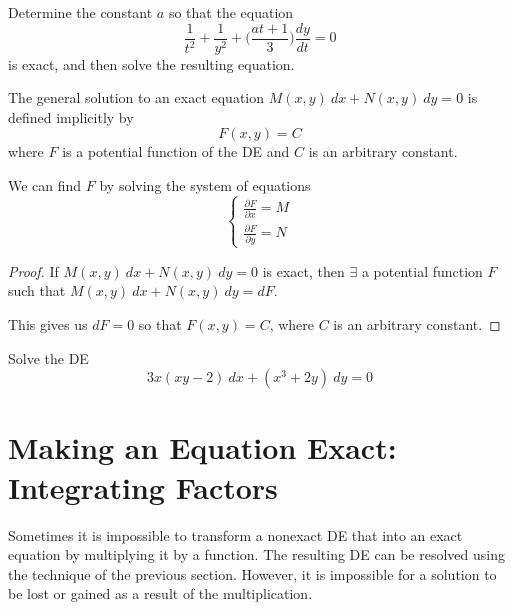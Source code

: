 \begin{example}
    Determine the constant $a$ so that the equation 
    \[
        \frac{1}{t^2} + \frac{1}{y^2} + \biggl(\frac{at+1}{3}\biggr) \frac{dy}{dt} = 0
    \]
    is exact, and then solve the resulting equation.
\end{example}

\begin{theorem}
    The general solution to an exact equation $M(x,y)\>dx + N(x,y)\>dy = 0$ is 
    defined implicitly by 
    \begin{equation}
        F(x,y) = C
    \end{equation}
    where $F$ is a potential function of the DE and $C$ is an 
    arbitrary constant.
\end{theorem}
\begin{remark}
    We can find $F$ by solving the system of equations 
    \begin{equation}
        \begin{cases}
            \displaystyle 
            \frac{\partial F}{\partial x} = M\\[1em]
            \displaystyle 
            \frac{\partial F}{\partial y} = N
        \end{cases}
    \end{equation}
\end{remark}

\begin{proof}
    If $M(x,y)\>dx + N(x,y)\>dy = 0$ is exact, then $\exists$ a potential
    function $F$ such that $M(x,y)\>dx + N(x,y)\>dy = dF$.

    This gives us $dF = 0$ so that $F(x,y) = C$, where $C$ is an arbitrary 
    constant.
\end{proof}

\begin{example}
    Solve the DE 
    \[
        3x(xy - 2)\> dx + (x^3 + 2y)\> dy = 0
    \]
\end{example}

\section{Making an Equation Exact: Integrating Factors}

Sometimes it is impossible to transform a nonexact DE that into an exact 
equation by multiplying it by a function. The resulting DE can be resolved using the technique
 of the previous section. However, it is impossible for a solution to be lost or gained as 
a result of the multiplication.

